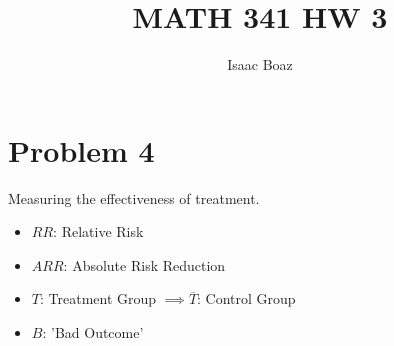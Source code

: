 \documentclass{article}
\title{\vspace{-5ex}MATH 341 HW 3}
\author{Isaac Boaz}
\begin{document}
\maketitle

\section*{Problem 4}
Measuring the effectiveness of treatment.
\begin{itemize}[noitemsep]
    \item \(RR\): Relative Risk
    \item \(ARR\): Absolute Risk Reduction
    \item \(T\): Treatment Group \(\implies \overline{T}\): Control Group
    \item \(B\): 'Bad Outcome'
\end{itemize}
\end{document}
